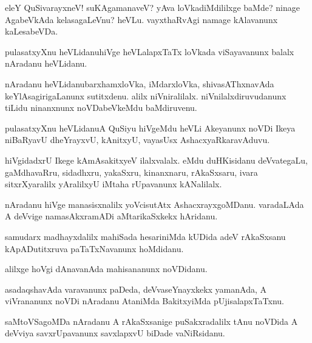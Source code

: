 \begin{mng}
eleY QuSivarayxneV! suKAgamanaveV? yAva loVkadiMdililxge baMde? ninage AgabeVkAda kelasagaLeVnu? heVLu. vayxthaRvAgi namage kAlavanunx kaLesabeVDa.
\end{mng}

\begin{mng}
pulasatxyXnu heVLidanu\mdash hiVge heVLalapxTaTx loVkada viSayavanunx balalx nAradanu heVLidanu.
\end{mng}

\begin{mng}
nAradanu heVLidanu\mdash barxhamxloVka, iMdarxloVka, shivasAThxnavAda keYlAsagirigaLanunx sutitxdenu. alilx niVniralilalx. niVnilalxdiruvudanunx tiLidu ninanxnunx noVDabeVkeMdu baMdiruvenu.
\end{mng}

\begin{mng}
pulasatxyXnu heVLidanu\mdash A QuSiyu hiVgeMdu heVLi Akeyanunx noVDi Ikeya niBaRyavU dheYrayxvU, kAnitxyU, vayasUsx AshacxyaRkaravAduvu.
\end{mng}

\begin{mng}
hiVgidadxrU Ikege kAmAsakitxyeV ilalxvalalx. eMdu duHKisidanu deVvategaLu, gaMdhavaRru, sidadhxru, yakaSxru, kinanxnaru, rAkaSxsaru, ivara sitxrXyaralilx yAralilxyU iMtaha rUpavanunx kANalilalx.
\end{mng}

\begin{mng}
nAradanu hiVge manasisxnalilx yoVcisutAtx AshacxrayxgoMDanu. varadaLAda A deVvige namasAkxramADi aMtarikaSxkekx hAridanu.
\end{mng}

\begin{mng}
samudarx madhayxdalilx mahiSada hesariniMda kUDida adeV rAkaSxsanu kApADutitxruva paTaTxNavanunx hoMdidanu.
\end{mng}

\begin{mng}
alilxge hoVgi dAnavanAda mahisananunx noVDidanu.
\end{mng}

\begin{mng}
asadaqshavAda varavanunx paDeda, deVvaseYnayxkekx yamanAda, A viVrananunx noVDi nAradanu AtaniMda BakitxyiMda pUjisalapxTaTxnu.
\end{mng}

\begin{mng}
saMtoVSagoMDa nAradanu A rAkaSxsanige puSakxradalilx tAnu noVDida A deVviya savxrUpavanunx savxlapxvU biDade vaNiRsidanu.
\end{mng}

